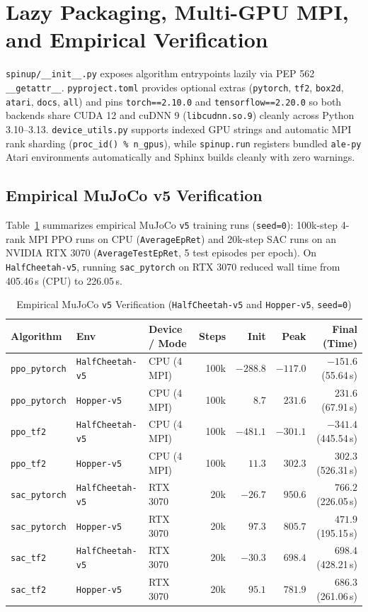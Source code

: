 \documentclass{article}
\begin{document}
\section{Lazy Packaging, Multi-GPU MPI, and Empirical Verification}
\texttt{spinup/\_\_init\_\_.py} exposes algorithm entrypoints lazily via PEP 562 \texttt{\_\_getattr\_\_}. \texttt{pyproject.toml} provides optional extras (\texttt{pytorch}, \texttt{tf2}, \texttt{box2d}, \texttt{atari}, \texttt{docs}, \texttt{all}) and pins \texttt{torch==2.10.0} and \texttt{tensorflow==2.20.0} so both backends share CUDA 12 and cuDNN 9 (\texttt{libcudnn.so.9}) cleanly across Python 3.10--3.13. \texttt{device\_utils.py} supports indexed GPU strings and automatic MPI rank sharding (\texttt{proc\_id() \% n\_gpus}), while \texttt{spinup.run} registers bundled \texttt{ale-py} Atari environments automatically and Sphinx builds cleanly with zero warnings.

\subsection{Empirical MuJoCo v5 Verification}
Table~\ref{tab:mujoco-v5} summarizes empirical MuJoCo \texttt{v5} training runs (\texttt{seed=0}): 100k-step 4-rank MPI PPO runs on CPU (\texttt{AverageEpRet}) and 20k-step SAC runs on an NVIDIA RTX 3070 (\texttt{AverageTestEpRet}, 5 test episodes per epoch). On \texttt{HalfCheetah-v5}, running \texttt{sac\_pytorch} on RTX 3070 reduced wall time from 405.46\,s (CPU) to 226.05\,s.

\begin{table}[h]
\centering
\caption{Empirical MuJoCo \texttt{v5} Verification (\texttt{HalfCheetah-v5} and \texttt{Hopper-v5}, \texttt{seed=0})}
\label{tab:mujoco-v5}
\begin{tabular}{@{}lllrrrr@{}}
\toprule
Algorithm & Env & Device / Mode & Steps & Init & Peak & Final (Time) \\ \midrule
\texttt{ppo\_pytorch} & \texttt{HalfCheetah-v5} & CPU (4 MPI) & 100k & $-288.8$ & $-117.0$ & $-151.6$ (55.64\,s) \\
\texttt{ppo\_pytorch} & \texttt{Hopper-v5} & CPU (4 MPI) & 100k & $8.7$ & $231.6$ & $231.6$ (67.91\,s) \\
\texttt{ppo\_tf2} & \texttt{HalfCheetah-v5} & CPU (4 MPI) & 100k & $-481.1$ & $-301.1$ & $-341.4$ (445.54\,s) \\
\texttt{ppo\_tf2} & \texttt{Hopper-v5} & CPU (4 MPI) & 100k & $11.3$ & $302.3$ & $302.3$ (526.31\,s) \\
\texttt{sac\_pytorch} & \texttt{HalfCheetah-v5} & RTX 3070 & 20k & $-26.7$ & $950.6$ & $766.2$ (226.05\,s) \\
\texttt{sac\_pytorch} & \texttt{Hopper-v5} & RTX 3070 & 20k & $97.3$ & $805.7$ & $471.9$ (195.15\,s) \\
\texttt{sac\_tf2} & \texttt{HalfCheetah-v5} & RTX 3070 & 20k & $-30.3$ & $698.4$ & $698.4$ (428.21\,s) \\
\texttt{sac\_tf2} & \texttt{Hopper-v5} & RTX 3070 & 20k & $95.1$ & $781.9$ & $686.3$ (261.06\,s) \\ \bottomrule
\end{tabular}
\end{table}
\end{document}
